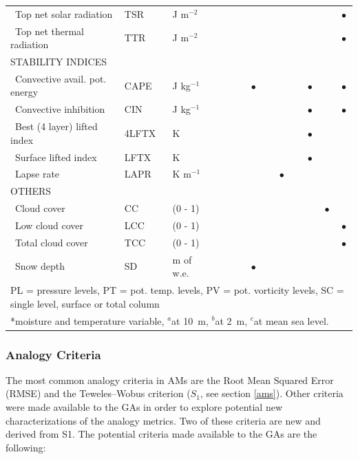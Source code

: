 \documentclass[draft]{agujournal2019}
\begin{document}
\begin{table}[!htbp]
{\begin{tabular}{lll|cccc|cccc|cc}
		\ Top net solar radiation & TSR & J m$^{-2}$ &  &  &  &  &  &  &  & & & $\bullet$ \\
		\ Top net thermal radiation & TTR & J m$^{-2}$ &  &  &  &  &  &  &  & & & $\bullet$ \\
		\hline
		\multicolumn{3}{l|}{\uppercase{Stability indices}} & & & & & & & & & & \\
		\ Convective avail. pot. energy & CAPE & J kg$^{-1}$ &  &  &  & $\bullet$ &  &  &  & $\bullet$ & & $\bullet$ \\
		\ Convective inhibition & CIN & J kg$^{-1}$ &  &  &  &  &  &  &  & $\bullet$ & & $\bullet$ \\
		\ Best (4 layer) lifted index & 4LFTX & K &  &  &  &  &  &  &  & $\bullet$ & & \\
		\ Surface lifted index & LFTX & K &  &  &  &  &  &  &  & $\bullet$ & & \\
		\ Lapse rate & LAPR & K m$^{-1}$ &  &  &  &  &  & $\bullet$ &  &  & & \\
		\hline
		\multicolumn{3}{l|}{\uppercase{Others}} & & & & & & & & & & \\
		\ Cloud cover & CC & (0 - 1) &  &  &  &  &  &  &  &  & $\bullet$ & \\
		\ Low cloud cover & LCC & (0 - 1) &  &  &  &  &  &  &  &  & & $\bullet$ \\
		\ Total cloud cover & TCC & (0 - 1) &  &  &  &  &  &  &  &  &  & $\bullet$ \\
		\ Snow depth & SD & m of w.e. &  &  &  & $\bullet$ &  &  &  &  & & \\
		\hline
		\multicolumn{13}{l}{PL = pressure levels, PT = pot. temp. levels, PV = pot. vorticity levels, SC = single level, surface or total column} \\
		\multicolumn{13}{l}{*moisture and temperature variable, $^{a}$at 10~m, $^{b}$at 2~m, $^{c}$at mean sea level.}\\
		\hline 
	\end{tabular}}
	\label{list_variables}
\end{table}


\subsubsection{Analogy Criteria}
\label{criteria}

The most common analogy criteria in AMs are the Root Mean Squared Error (RMSE) and the Teweles--Wobus criterion ($S_{1}$, see section \ref{ams}). Other criteria were made available to the GAs in order to explore potential new characterizations of the analogy metrics. Two of these criteria are new and derived from S1. The potential criteria made available to the GAs are the following:
\end{document}
